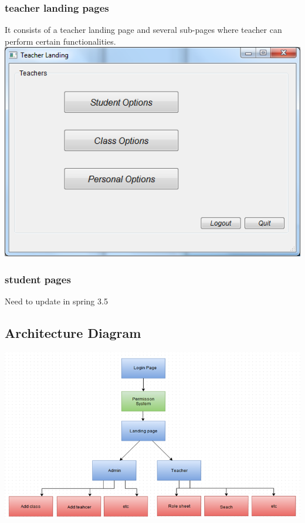 \subsubsection{teacher landing pages} 
It consists of a teacher landing page and several sub-pages where teacher can perform certain functionalities.\\
\includegraphics[scale=0.7]{pics/teacher_landing.png}

\subsubsection{student pages}
Need to update in spring 3.5

\subsection{Architecture Diagram}
\includegraphics[scale=0.5]{pics/gui.png}\\

